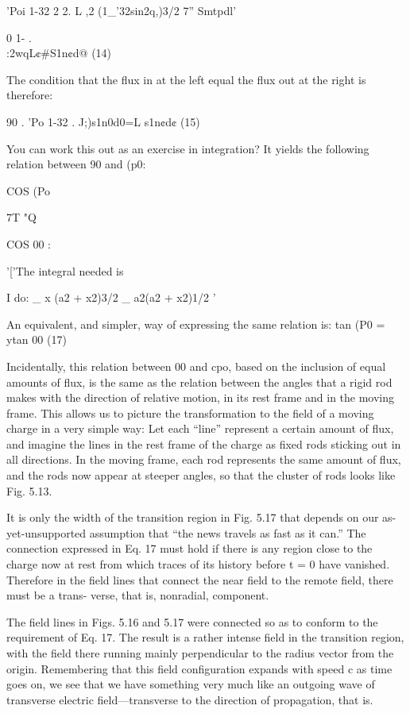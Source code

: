 'Poi 1-32 2 2.
L ,2 (1_'32sin2q,)3/2 7'' Smtpdl'

0 1- .
\begin{equation}
\end{equation}
:2wqL¢#S1n¢d@ (14)

The condition that the flux in at the left equal the flux out at the
right is therefore:

\begin{equation}
\end{equation}
90 . 'Po 1-32 .
J;)s1n0d0=L  s1n¢d¢ (15)

You can work this out as an exercise in integration? It yields the
following relation between 90 and (p0:

COS (Po

7T  "Q

COS 00 :

'['The integral needed is

I do: _ x
(a2 + x2)3/2 _ a2(a2 + x2)1/2 '

An equivalent, and simpler, way of expressing the same relation is:
tan (P0 = ytan 00 (17)
\begin{equation}
\end{equation}

Incidentally, this relation between 00 and cpo, based on the inclusion
of equal amounts of flux, is the same as the relation between the
angles that a rigid rod makes with the direction of relative motion,
in its rest frame and in the moving frame. This allows us to picture
the transformation to the field of a moving charge in a very simple
way: Let each ``line'' represent a certain amount of flux, and imagine
the lines in the rest frame of the charge as fixed rods sticking out in
all directions. In the moving frame, each rod represents the same
amount of flux, and the rods now appear at steeper angles, so that
the cluster of rods looks like Fig. 5.13.

It is only the width of the transition region in Fig. 5.17 that depends
on our as-yet-unsupported assumption that ``the news travels
as fast as it can.'' The connection expressed in Eq. 17 must hold if
there is any region close to the charge now at rest from which traces
of its history before t = 0 have vanished. Therefore in the field lines
that connect the near field to the remote field, there must be a trans-
verse, that is, nonradial, component.

The field lines in Figs. 5.16 and 5.17 were connected so as to conform
to the requirement of Eq. 17. The result is a rather intense
field in the transition region, with the field there running mainly perpendicular
to the radius vector from the origin. Remembering that
this field configuration expands with speed c as time goes on, we see
that we have something very much like an outgoing wave of transverse
electric field---transverse to the direction of propagation, that is.

